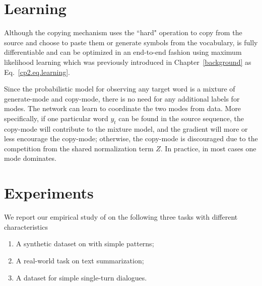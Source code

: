 \section{Learning} 	
Although the copying mechanism uses the ``hard" operation to copy from the source and choose to paste them or generate symbols from the vocabulary, \copynet is fully differentiable and can be optimized in an end-to-end fashion using maximum likelihood learning which was previously introduced in 	Chapter~\ref{background} as Eq.~\eqref{cp2.eq.learning}.

 Since the probabilistic model for observing any target word is a mixture of generate-mode and copy-mode, there is no need for any additional labels for modes. The network can learn to coordinate the two modes from data. More specifically, if one particular word $y_{t}$ can be found in the source sequence, the copy-mode will contribute to the mixture model, and the gradient will more or less encourage the copy-mode; otherwise, the copy-mode is discouraged due to the competition from the shared normalization term $Z$. In practice, in most cases one mode dominates.


\section{Experiments}
We report our empirical study of \copynet on the following three tasks with different characteristics
\begin{enumerate}
	\item A synthetic dataset on with simple patterns;
	\item A real-world task on text summarization;
	\item A dataset for simple single-turn dialogues.
\end{enumerate}  

